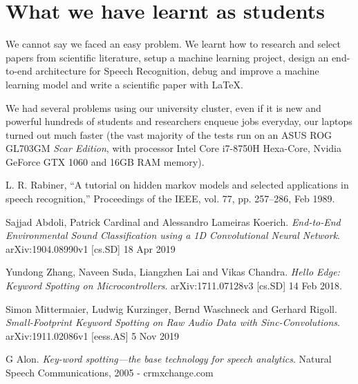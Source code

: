 \documentclass[conference]{IEEEtran}
\begin{document}
\section*{What we have learnt as students}
We cannot say we faced an easy problem. We learnt how to research and select papers from scientific literature, setup a machine learning project, design an end-to-end architecture for Speech Recognition, debug and improve a machine learning model and write a scientific paper with \LaTeX\xspace.

We had several problems using our university cluster, even if it is new and powerful hundreds of students and researchers enqueue jobs everyday, our laptops turned out much faster (the vast majority of the tests run on an ASUS ROG GL703GM \textit{Scar Edition}, with processor Intel Core i7-8750H Hexa-Core, Nvidia  GeForce GTX 1060 and 16GB RAM memory).

\begin{thebibliography}{1}
L. R. Rabiner, “A tutorial on hidden markov models and selected applications in speech recognition,” Proceedings of the IEEE, vol. 77, pp. 257–286, Feb 1989.

Sajjad Abdoli, Patrick Cardinal and Alessandro Lameiras Koerich. \textit{End-to-End Environmental Sound Classification using a 1D Convolutional Neural Network}. arXiv:1904.08990v1 [cs.SD] 18 Apr 2019

Yundong Zhang, Naveen Suda, Liangzhen Lai and Vikas Chandra. \textit{Hello Edge: Keyword Spotting on Microcontrollers}. arXiv:1711.07128v3 [cs.SD] 14 Feb 2018.

Simon Mittermaier, Ludwig Kurzinger, Bernd Waschneck and Gerhard Rigoll. \textit{Small-Footprint Keyword Spotting on Raw Audio Data with Sinc-Convolutions}. arXiv:1911.02086v1 [eess.AS] 5 Nov 2019

G Alon. \textit{Key-word spotting—the base technology for speech analytics}. Natural Speech Communications, 2005 - crmxchange.com
\end{thebibliography}
\end{document}
